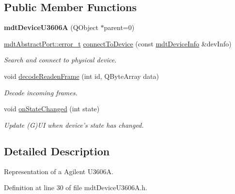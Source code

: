 \subsection*{Public Member Functions}
\begin{DoxyCompactItemize}
\item 
\hypertarget{classmdt_device_u3606_a_a91201ae14df7b553a947b5857eaa1c65}{
{\bfseries mdtDeviceU3606A} (QObject $\ast$parent=0)}
\label{classmdt_device_u3606_a_a91201ae14df7b553a947b5857eaa1c65}

\item 
\hyperlink{classmdt_abstract_port_ad4121bb930c95887e77f8bafa065a85e}{mdtAbstractPort::error\_\-t} \hyperlink{classmdt_device_u3606_a_acf3b48b13bc179ad4f94b3011b7d607a}{connectToDevice} (const \hyperlink{classmdt_device_info}{mdtDeviceInfo} \&devInfo)
\begin{DoxyCompactList}\small\item\em Search and connect to physical device. \end{DoxyCompactList}\item 
void \hyperlink{classmdt_device_u3606_a_ac20d3e5177158c26bcbc5ca2d30cd563}{decodeReadenFrame} (int id, QByteArray data)
\begin{DoxyCompactList}\small\item\em Decode incoming frames. \end{DoxyCompactList}\item 
\hypertarget{classmdt_device_u3606_a_a94a6f8b3f64cd35b33204c66816f3f6a}{
void \hyperlink{classmdt_device_u3606_a_a94a6f8b3f64cd35b33204c66816f3f6a}{onStateChanged} (int state)}
\label{classmdt_device_u3606_a_a94a6f8b3f64cd35b33204c66816f3f6a}

\begin{DoxyCompactList}\small\item\em Update (G)UI when device's state has changed. \end{DoxyCompactList}\end{DoxyCompactItemize}


\subsection{Detailed Description}
Representation of a Agilent U3606A. 

Definition at line 30 of file mdtDeviceU3606A.h.



